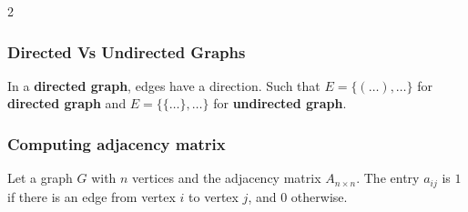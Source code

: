 \documentclass[5pt]{article}
\begin{document}
\begin{multicols}{2}
\subsubsection{Directed Vs Undirected Graphs}
In a \textbf{directed graph}, edges have a direction. Such that $E=\{(\dots), \dots\}$ for \textbf{directed graph} and $E=\{\{\dots\}, \dots\}$ for \textbf{undirected graph}.\\

\subsubsection{Computing adjacency matrix}
Let a graph $G$ with $n$ vertices and the adjacency matrix $A_{n\times n}$. 
The entry $a_{ij}$ is $1$ if there is an edge from vertex $i$ to vertex $j$, and $0$ otherwise.


\end{multicols}
\end{document}
